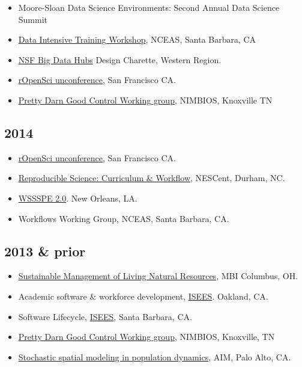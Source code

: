 \documentclass[10pt,sans]{moderncv}        %
\providecommand{\tightlist}{%
    \setlength{\itemsep}{0pt}\setlength{\parskip}{0pt}}
\begin{document}
\begin{itemize}
\tightlist
\item
  Moore-Sloan Data Science Environments: Second Annual Data Science
  Summit
\item
  \href{https://github.com/NCEAS/ds-workshop-2015}{Data Intensive
  Training Workshop}, NCEAS, Santa Barbara, CA
\item
  \href{http://www.nsf.gov/pubs/2015/nsf15562/nsf15562.htm}{NSF Big Data
  Hubs} Design Charette, Western Region.
\item
  \href{http://unconf.ropensci.org/}{rOpenSci unconference}, San
  Francisco CA.
\item
  \href{http://www.nimbios.org/workinggroups/WG_PDG}{Pretty Darn Good
  Control Working group}, NIMBIOS, Knoxville TN
\end{itemize}

\subsection{2014}\label{section-4}

\begin{itemize}
\tightlist
\item
  \href{http://ropensci.org/blog/2014/05/14/ropenhack/}{rOpenSci
  unconference}, San Francisco CA.
\item
  \href{https://github.com/Reproducible-Science-Curriculum/Reproducible-Science-Hackathon-Dec-08-2014}{Reproducible
  Science: Curriculum \& Workflow}, NESCent, Durham, NC.
\item
  \href{http://wssspe.researchcomputing.org.uk/wssspe2/}{WSSSPE 2.0}.
  New Orleans, LA.
\item
  Workflows Working Group, NCEAS, Santa Barbara, CA.
\end{itemize}

\subsection{2013 \& prior}\label{prior-1}

\begin{itemize}
\tightlist
\item
  \href{http://www.mbi.ohio-state.edu/2013/ws3description.html}{Sustainable
  Management of Living Natural Resources}, MBI Columbus, OH.
\item
  Academic software \& workforce development,
  \href{http://isees.nceas.ucsb.edu}{ISEES}. Oakland, CA.
\item
  Software Lifecycle, \href{http://isees.nceas.ucsb.edu}{ISEES}, Santa
  Barbara, CA.
\item
  \href{http://www.nimbios.org/workinggroups/WG_PDG}{Pretty Darn Good
  Control Working group}, NIMBIOS, Knoxville, TN
\item
  \href{http://www.aimath.org/WWN/populationmodel/}{Stochastic spatial
  modeling in population dynamics}, AIM, Palo Alto, CA.
\end{itemize}
\end{document}
